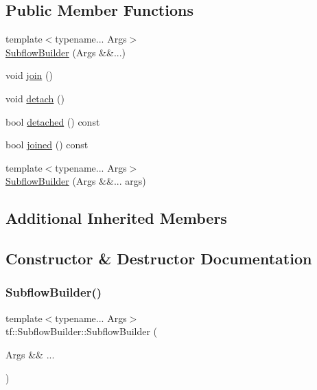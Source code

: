 \subsection*{Public Member Functions}
\begin{DoxyCompactItemize}
\item 
{\footnotesize template$<$typename... Args$>$ }\\\hyperlink{classtf_1_1SubflowBuilder_a74ae78a9e2f4c3280e39577dffecfbb6}{Subflow\+Builder} (Args \&\&...)
\item 
void \hyperlink{classtf_1_1SubflowBuilder_a10cff676153ad0e83d15a33e8469f59e}{join} ()
\item 
void \hyperlink{classtf_1_1SubflowBuilder_a0660bc0ca5ec375700703cbc94f66942}{detach} ()
\item 
bool \hyperlink{classtf_1_1SubflowBuilder_a39793fbfee4d3fe01541cfd04bf1a5c7}{detached} () const
\item 
bool \hyperlink{classtf_1_1SubflowBuilder_a7e6d76a68180e51cb4108f58a14d5216}{joined} () const
\item 
{\footnotesize template$<$typename... Args$>$ }\\\hyperlink{classtf_1_1SubflowBuilder_a17303b7da88214fa10401d4a3e334070}{Subflow\+Builder} (Args \&\&... args)
\end{DoxyCompactItemize}
\subsection*{Additional Inherited Members}


\subsection{Constructor \& Destructor Documentation}
\mbox{\label{classtf_1_1SubflowBuilder_a74ae78a9e2f4c3280e39577dffecfbb6}} 
\subsubsection{\texorpdfstring{Subflow\+Builder()}{SubflowBuilder()}\hspace{0.1cm}{\footnotesize\ttfamily [1/2]}}
{\footnotesize\ttfamily template$<$typename... Args$>$ \\
tf\+::\+Subflow\+Builder\+::\+Subflow\+Builder (\begin{DoxyParamCaption}\item[{Args \&\&}]{... }\end{DoxyParamCaption})}

